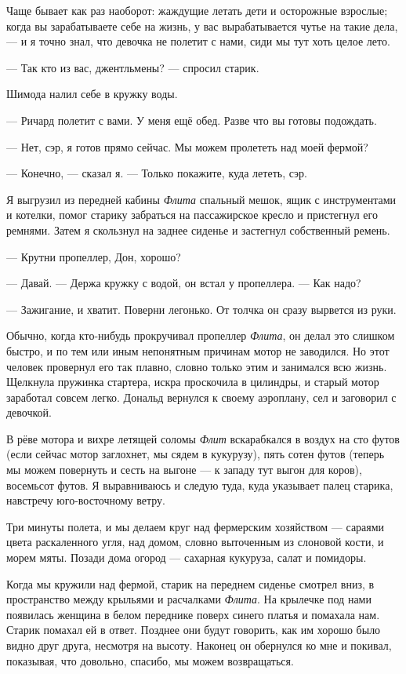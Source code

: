 Чаще бывает как раз наоборот: жаждущие летать дети и осторожные взрослые; когда вы зарабатываете себе на жизнь, у вас вырабатывается чутье на такие дела, --- и я точно знал, что девочка не полетит с нами, сиди мы тут хоть целое лето.

--- Так кто из вас, джентльмены? --- спросил старик.

Шимода налил себе в кружку воды.

--- Ричард полетит с вами. У меня ещё обед. Разве что вы готовы подождать.

--- Нет, сэр, я готов прямо сейчас. Мы можем пролететь над моей фермой?

--- Конечно, --- сказал я. --- Только покажите, куда лететь, сэр.

Я выгрузил из передней кабины {\it Флита\/} спальный мешок, ящик с инструментами и котелки, помог старику забраться на пассажирское кресло и пристегнул его ремнями. Затем я скользнул на заднее сиденье и застегнул собственный ремень.

--- Крутни пропеллер, Дон, хорошо?

--- Давай. --- Держа кружку с водой, он встал у пропеллера. --- Как надо?

--- Зажигание, и хватит. Поверни легонько. От толчка он сразу вырвется из руки.

Обычно, когда кто-нибудь прокручивал пропеллер {\it Флита}, он делал это слишком быстро, и по тем или иным непонятным причинам мотор не заводился. Но этот человек провернул его так плавно, словно только этим и занимался всю жизнь. Щелкнула пружинка стартера, искра проскочила в цилиндры, и старый мотор заработал совсем легко. Дональд вернулся к своему аэроплану, сел и заговорил с девочкой.

В рёве мотора и вихре летящей соломы {\it Флит\/} вскарабкался в воздух на сто футов (если сейчас мотор заглохнет, мы сядем в кукурузу), пять сотен футов (теперь мы можем повернуть и сесть на выгоне --- к западу тут выгон для коров), восемьсот футов. Я выравниваюсь и следую туда, куда указывает палец старика, навстречу юго-восточному ветру.

Три минуты полета, и мы делаем круг над фермерским хозяйством --- сараями цвета раскаленного угля, над домом, словно выточенным из слоновой кости, и морем мяты. Позади дома огород --- сахарная кукуруза, салат и помидоры.

Когда мы кружили над фермой, старик на переднем сиденье смотрел вниз, в пространство между
крыльями и расчалками {\it Флита}. На крылечке под нами появилась женщина в белом переднике поверх
синего платья и помахала нам. Старик помахал ей в ответ. Позднее они будут говорить, как им хорошо
было видно друг друга, несмотря на высоту. Наконец он обернулся ко мне и покивал, показывая, что
довольно, спасибо, мы можем возвращаться.

